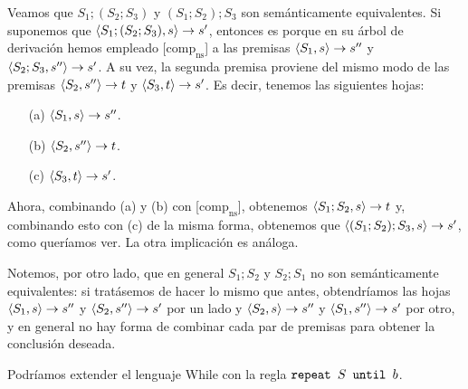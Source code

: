 \begin{example}
Veamos que $S_1; (S_2; S_3)$ y $(S_1; S_2); S_3$ son semánticamente equivalentes. Si suponemos que $\langle S_1; (S_2; S_3), s \rangle\rightarrow s'$, entonces es porque en su árbol de derivación hemos empleado [$\text{comp}_{\text{ns}}$] a las premisas $\langle S_1, s \rangle\rightarrow s''$ y $\langle S_2;S_3, s'' \rangle\rightarrow s'$. A su vez, la segunda premisa proviene del mismo modo de las premisas $\langle S_2, s'' \rangle\rightarrow t$ y $\langle S_3, t \rangle\rightarrow s'$. Es decir, tenemos las siguientes hojas:
\begin{itemize}
    \item[(a)] $\langle S_1, s \rangle\rightarrow s''$.
    \item[(b)] $\langle S_2, s'' \rangle\rightarrow t$.
    \item[(c)] $\langle S_3, t \rangle\rightarrow s'$.
\end{itemize}
Ahora, combinando (a) y (b) con [$\text{comp}_{\text{ns}}$], obtenemos $\langle S_1;S_2, s \rangle\rightarrow t$ y, combinando esto con (c) de la misma forma, obtenemos que $\langle (S_1; S_2);S_3, s \rangle\rightarrow s'$, como queríamos ver. La otra implicación es análoga.

Notemos, por otro lado, que en general $S_1;S_2$ y $S_2; S_1$ no son semánticamente equivalentes: si tratásemos de hacer lo mismo que antes, obtendríamos las hojas $\langle S_1, s \rangle\rightarrow s''$ y $\langle S_2, s'' \rangle\rightarrow s'$ por un lado y $\langle S_2, s \rangle\rightarrow s''$ y $\langle S_1, s'' \rangle\rightarrow s'$ por otro, y en general no hay forma de combinar cada par de premisas para obtener la conclusión deseada.
\end{example}

\begin{example}
Podríamos extender el lenguaje While con la regla $\texttt{repeat } S \texttt{ until } b$.
\end{example}